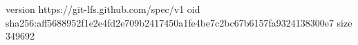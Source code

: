 version https://git-lfs.github.com/spec/v1
oid sha256:aff5688952f1e2e4fd2e709b2417450a1fe4be7c2bc67b6157fa9324138300e7
size 349692
